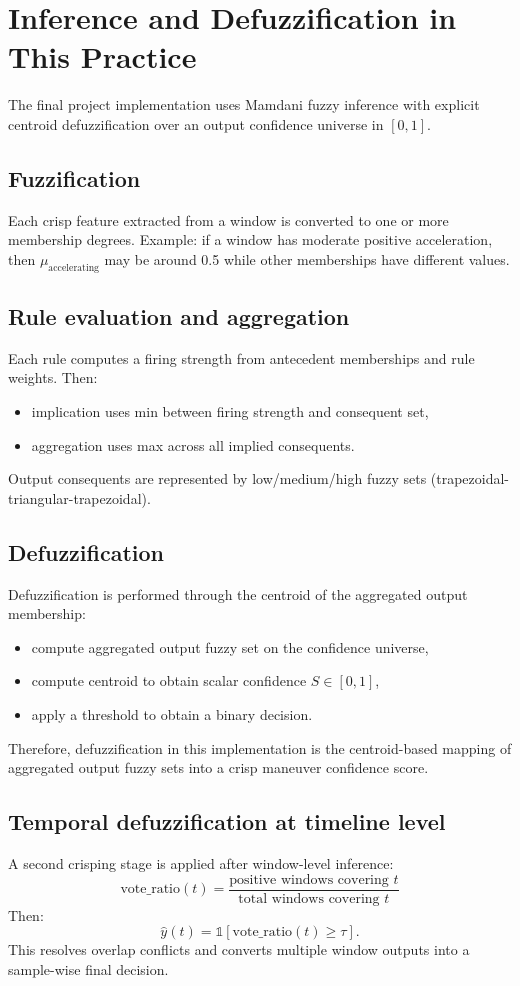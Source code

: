 \documentclass[11pt,a4paper]{article}
\begin{document}
\section{Inference and Defuzzification in This Practice}
The final project implementation uses Mamdani fuzzy inference with explicit centroid defuzzification over an output confidence universe in $[0,1]$.

\subsection{Fuzzification}
Each crisp feature extracted from a window is converted to one or more membership degrees. Example:
if a window has moderate positive acceleration, then $\mu_{\text{accelerating}}$ may be around 0.5 while other memberships have different values.

\subsection{Rule evaluation and aggregation}
Each rule computes a firing strength from antecedent memberships and rule weights. Then:
\begin{itemize}
    \item implication uses min between firing strength and consequent set,
    \item aggregation uses max across all implied consequents.
\end{itemize}
Output consequents are represented by low/medium/high fuzzy sets (trapezoidal-triangular-trapezoidal).

\subsection{Defuzzification}
Defuzzification is performed through the centroid of the aggregated output membership:
\begin{itemize}
    \item compute aggregated output fuzzy set on the confidence universe,
    \item compute centroid to obtain scalar confidence $S\in[0,1]$,
    \item apply a threshold to obtain a binary decision.
\end{itemize}

Therefore, defuzzification in this implementation is the centroid-based mapping of aggregated output fuzzy sets into a crisp maneuver confidence score.

\subsection{Temporal defuzzification at timeline level}
A second crisping stage is applied after window-level inference:
\[
\text{vote\_ratio}(t)=\frac{\text{positive windows covering } t}{\text{total windows covering } t}
\]
Then:
\[
\hat{y}(t)=\mathbb{1}[\text{vote\_ratio}(t)\ge \tau].
\]
This resolves overlap conflicts and converts multiple window outputs into a sample-wise final decision.
\end{document}
